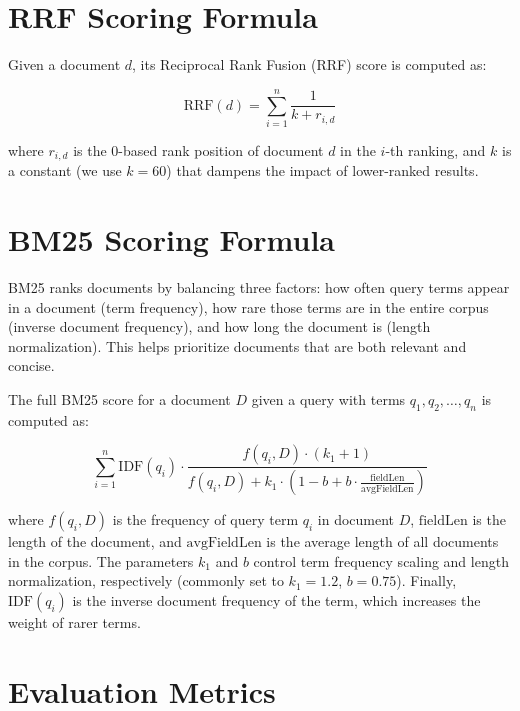 \documentclass{article}
\begin{document}
\section{RRF Scoring Formula}
\label{app:rrf}

Given a document \( d \), its Reciprocal Rank Fusion (RRF) score is computed as:

\begin{equation}
    \text{RRF}(d) = \sum_{i=1}^{n} \frac{1}{k + r_{i,d}}
\end{equation}

where \( r_{i,d} \) is the 0-based rank position of document \( d \) in the \(i\)-th ranking, and \( k \) is a constant (we use \(k = 60\)) that dampens the impact of lower-ranked results.

\section{BM25 Scoring Formula}
\label{app:bm25}

BM25 ranks documents by balancing three factors: how often query terms appear in a document (term frequency), how rare those terms are in the entire corpus (inverse document frequency), and how long the document is (length normalization). This helps prioritize documents that are both relevant and concise.

The full BM25 score for a document \( D \) given a query with terms \( q_1, q_2, \ldots, q_n \) is computed as:

\begin{equation}
    \sum_{i=1}^{n} \mathrm{IDF}(q_i) \cdot \frac{f(q_i, D) \cdot (k_1 + 1)}{f(q_i, D) + k_1 \cdot \left(1 - b + b \cdot \frac{\mathrm{fieldLen}}{\text{avgFieldLen}}\right)}
\end{equation}

where \( f(q_i, D) \) is the frequency of query term \( q_i \) in document \( D \), \( \mathrm{fieldLen} \) is the length of the document, and \( \mathrm{avgFieldLen} \) is the average length of all documents in the corpus. The parameters \( k_1 \) and \( b \) control term frequency scaling and length normalization, respectively (commonly set to \( k_1 = 1.2 \), \( b = 0.75 \)). Finally, \( \mathrm{IDF}(q_i) \) is the inverse document frequency of the term, which increases the weight of rarer terms.

\section{Evaluation Metrics}
\label{app:metrics}
\end{document}
